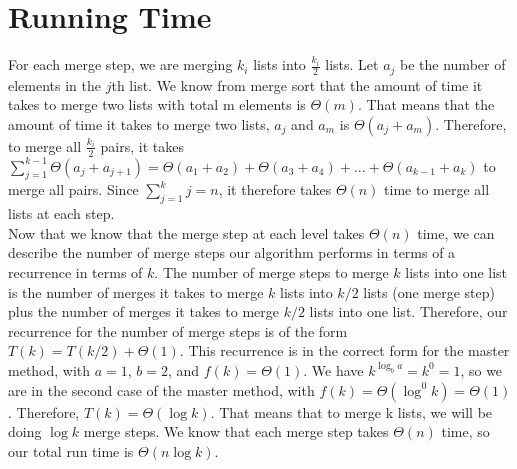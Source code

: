 \documentclass[12pt]{article}
\begin{document}
\section*{Running Time}
For each merge step, we are merging $k_i$ lists into $\frac{k_i}{2}$ lists. Let $a_j$ be the number of elements in the $j$th list. We know from merge sort that the amount of time it takes to merge two lists with total m elements is $\Theta(m)$. That means that the amount of time it takes to merge two lists, $a_j$ and $a_m$ is $\Theta(a_j + a_m)$. Therefore, to merge all $\frac{k_i}{2}$ pairs, it takes $\sum_{j = 1}^{k-1} \Theta(a_j + a_{j+1}) = \Theta(a_1 + a_2) + \Theta(a_3 + a_4) + ... + \Theta(a_{k-1} + a_k)$ to merge all pairs. Since $\sum_{j=1}^{k} j = n$, it therefore takes $\Theta(n)$ time to merge all lists at each step.\\
Now that we know that the merge step at each level takes $\Theta(n)$ time, we can describe the number of merge steps our algorithm performs in terms of a recurrence in terms of $k$. The number of merge steps to merge $k$ lists into one list is the number of merges it takes to merge $k$ lists into $k/2$ lists (one merge step) plus the number of merges it takes to merge $k/2$ lists into one list. Therefore, our recurrence for the number of merge steps is of the form $T(k) = T(k/2) + \Theta(1)$. This recurrence is in the correct form for the master method, with $a = 1$, $b = 2$, and $f(k) = \Theta(1)$. We have $k^{\log_b a} = k^0 = 1$, so we are in the second case of the master method, with $f(k) = \Theta(\log^0 k) = \Theta(1)$. Therefore, $T(k) = \Theta(\log k)$. That means that to merge k lists, we will be doing $\log k$ merge steps. We know that each merge step takes $\Theta(n)$ time, so our total run time is $\Theta(n \log k)$.
\end{document}
